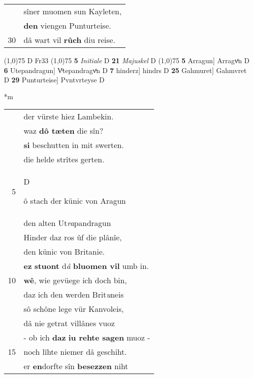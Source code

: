 \documentclass[8pt,a4paper,notitlepage]{article}
\begin{document}
\begin{table}[ht]
\begin{minipage}[t]{0.5\linewidth}
\begin{tabular}{rl}
 & sîner muomen sun Kayleten,\\ 
 & \textbf{den} viengen Punturteise.\\ 
30 & dâ wart vil \textbf{rûch} diu reise.\\ 
\end{tabular}
\scriptsize
\line(1,0){75} \newline
D Fr33 \newline
\line(1,0){75} \newline
\textbf{5} \textit{Initiale} D  \textbf{21} \textit{Majuskel} D  \newline
\line(1,0){75} \newline
\textbf{5} Arragun] Arragvͦn D \textbf{6} Utepandragun] Vͦtepandragvͦn D \textbf{7} hinderz] hindrs D \textbf{25} Gahmuret] Gahmvret D \textbf{29} Punturteise] Pvntvrteyse D \newline
\end{minipage}
\hspace{0.5cm}
\begin{minipage}[t]{0.5\linewidth}
\small
\begin{center}*m
\end{center}
\begin{tabular}{rl}
 & der vürste hiez Lambekin.\\ 
 & waz \textbf{dô tæten} die sîn?\\ 
 & \textbf{si} beschutten in mit swerten.\\ 
 & die helde strîtes gerten.\\ 
5 & \begin{large}D\end{large}ô stach der künic von Aragun\\ 
 & den alten Ut\textit{ra}pandragun\\ 
 & Hinder daz ros ûf die plânîe,\\ 
 & den künic von Britanie.\\ 
 & \textbf{ez} \textbf{stuont} d\textit{â} \textbf{bluomen vil} umb in.\\ 
10 & \textbf{wê}, wie gevüege ich doch bin,\\ 
 & daz ich den werden Brit\textit{u}neis\\ 
 & sô schône lege vür Kanvoleis,\\ 
 & dâ nie getrat villânes vuoz\\ 
 & - ob ich \textbf{daz} \textbf{iu rehte sagen} muoz -\\ 
15 & noch lîhte niemer dâ geschiht.\\ 
 & er \textbf{en}dorfte sîn \textbf{besezzen} niht\\ 

\end{tabular}
\end{minipage}
\end{table}
\end{document}
